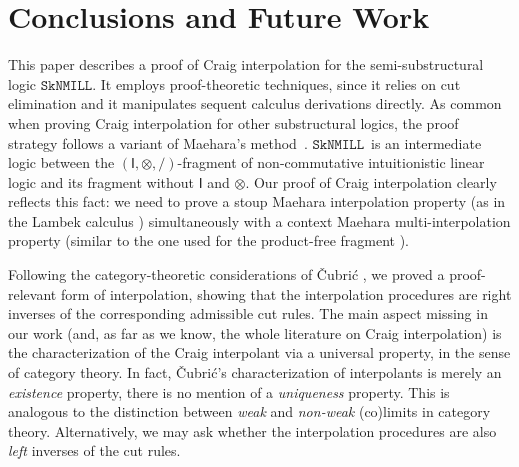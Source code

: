 \documentclass[sn-mathphys-num]{sn-jnl}%
\newcommand{\ot}{\otimes}
\newcommand{\unit}{\mathsf{I}}
\newcommand{\sls}{\slash}
\newcommand{\SkNMILL}{$\mathtt{SkNMILL}$}
\theoremstyle{thmstyleone}%
\theoremstyle{thmstyletwo}%
\theoremstyle{thmstylethree}%
\begin{document}
\section{Conclusions and Future Work}

This paper describes a proof of Craig interpolation for the semi-substructural logic \SkNMILL.
It employs proof-theoretic techniques, since it relies on cut elimination and it manipulates sequent calculus derivations directly.
As common when proving Craig interpolation for other substructural logics, the proof strategy follows a variant of Maehara's method~\cite{maehara1961}.
\SkNMILL~is an intermediate logic between the $(\unit,\ot,\sls)$-fragment of non-commutative intuitionistic linear logic and its fragment without $\unit$ and $\ot$.
Our proof of Craig interpolation clearly reflects this fact: we need to prove a stoup Maehara interpolation property (as in the Lambek calculus \cite{ono:proof:nonclassical:1998}) simultaneously with a context Maehara multi-interpolation property (similar to the one used for the product-free fragment \cite{Pentus1997}).

Following the category-theoretic considerations of {\v{C}}ubri{\'c} \cite{Cubric1994}, we proved a proof-relevant form of interpolation, showing that the interpolation procedures are right inverses of the corresponding admissible cut rules.
The main aspect missing in our work (and, as far as we know, the whole literature on Craig interpolation) is the characterization of the Craig interpolant via a universal property, in the sense of category theory.
In fact, {\v{C}}ubri{\'c}'s characterization of interpolants is merely an \emph{existence} property, there is no mention of a \emph{uniqueness} property.
This is analogous to the distinction between \emph{weak} and \emph{non-weak} (co)limits in category theory.
Alternatively, we may ask whether the interpolation procedures are also \emph{left} inverses of the cut rules.
\end{document}
